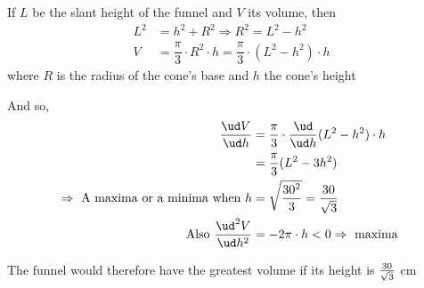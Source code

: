 \begin{solution}[\halfpage]
   If $L$ be the slant height of the funnel and $V$ its volume, then 
   \begin{align}
       L^2 &= h^2 + R^2 \Rightarrow R^2 = L^2 - h^2 \\ 
       V &= \dfrac{\pi}{3}\cdot R^2\cdot h = \dfrac{\pi}{3}\cdot(L^2 - h^2)\cdot h
   \end{align}
   where $R$ is the radius of the cone's base and $h$ the cone's height
   
   And so, 
   \begin{align}
      \dfrac{\ud V}{\ud h} &= \dfrac{\pi}{3}\cdot\dfrac{\ud}{\ud h}(L^2-h^2)\cdot h \\
             &= \dfrac{\pi}{3}(L^2 - 3h^2) \\
      \Rightarrow\text{ A maxima or a minima when } h &= \sqrt{\dfrac{\vbone^2}{3}} = \dfrac{\vbone}{\sqrt{3}} \\
      \text{Also }\dfrac{\ud^2 V}{\ud h^2} &= -2\pi\cdot h < 0 \Rightarrow \text{ maxima }
   \end{align}
   
   The funnel would therefore have the greatest volume if its height is $\frac{30}{\sqrt{3}}$ cm
   
\end{solution}
